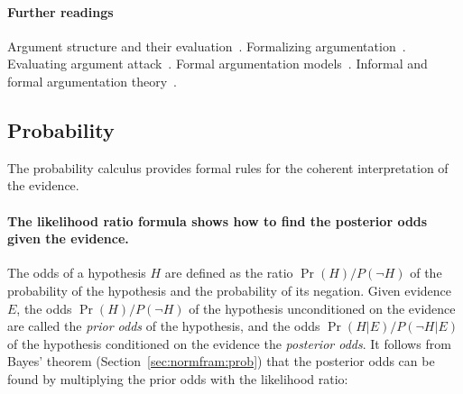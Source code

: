 \documentclass[10pt]{article}
\begin{document}
\paragraph{Further readings}
Argument structure and their evaluation~\citep{pollock1995}. Formalizing argumentation~\citep{prakkenVreeswijk2002}. Evaluating argument attack~\citep{dung1995}. 
Formal argumentation models~\citep{simariLoui1992, vreeswijk1997, prakken2010, verheij2003deflog, gordonEtal2007}. Informal and formal argumentation theory~\citep{vanEemerenEtal2014}.





\subsection{Probability}

The probability calculus provides formal rules for the coherent interpretation of the evidence.


\paragraph{The likelihood ratio formula shows how to find the posterior odds given the evidence.} 
The odds of a hypothesis $H$ are defined as the ratio $\Pr(H)/P(\neg H)$ of the probability of the hypothesis and the probability of its negation. Given evidence $E$, the odds $\Pr(H)/P(\neg H)$ 
of the hypothesis unconditioned on the evidence are called the \emph{prior odds} of the hypothesis, and the odds $\Pr(H | E)/P(\neg H | E)$ of the hypothesis 
conditioned on the evidence the \emph{posterior odds}.%
It follows from Bayes' theorem (Section~\ref{sec:normfram:prob}) that the posterior odds can 
be found by multiplying the prior odds with the likelihood ratio: 
\end{document}
